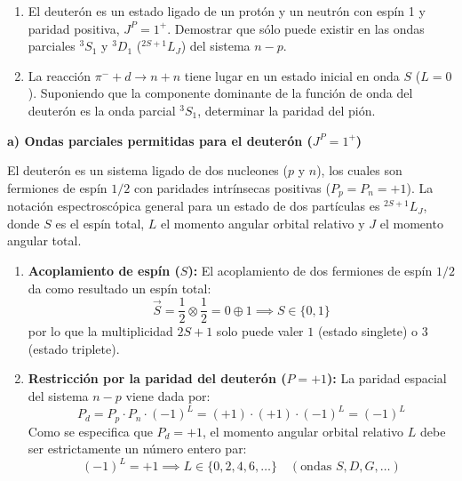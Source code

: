 \newpage
\begin{problema}
\begin{enumerate}[label=\alph*)]
    \item El deuterón es un estado ligado de un protón y un neutrón con espín 1 y paridad positiva, $J^P = 1^+$. Demostrar que sólo puede existir en las ondas parciales $^3S_1$ y $^3D_1$ ($^{2S+1}L_J$) del sistema $n-p$.
    \item La reacción $\pi^- + d \to n + n$ tiene lugar en un estado inicial en onda $S$ ($L = 0$). Suponiendo que la componente dominante de la función de onda del deuterón es la onda parcial $^3S_1$, determinar la paridad del pión.
\end{enumerate}
\tcblower
\textbf{a) Ondas parciales permitidas para el deuterón ($J^P = 1^+$)}

El deuterón es un sistema ligado de dos nucleones ($p$ y $n$), los cuales son fermiones de espín $1/2$ con paridades intrínsecas positivas ($P_p = P_n = +1$). La notación espectroscópica general para un estado de dos partículas es $^{2S+1}L_J$, donde $S$ es el espín total, $L$ el momento angular orbital relativo y $J$ el momento angular total.

\begin{enumerate}[label=\arabic*.]
    \item \textbf{Acoplamiento de espín ($S$):}
    El acoplamiento de dos fermiones de espín $1/2$ da como resultado un espín total:
    \begin{equation*}
        \vec{S} = \frac{1}{2} \otimes \frac{1}{2} = 0 \oplus 1 \implies S \in \{0, 1\}
    \end{equation*}
    por lo que la multiplicidad $2S+1$ solo puede valer $1$ (estado singlete) o $3$ (estado triplete).

    \item \textbf{Restricción por la paridad del deuterón ($P = +1$):}
    La paridad espacial del sistema $n-p$ viene dada por:
    \begin{equation*}
        P_d = P_p \cdot P_n \cdot (-1)^L = (+1) \cdot (+1) \cdot (-1)^L = (-1)^L
    \end{equation*}
    Como se especifica que $P_d = +1$, el momento angular orbital relativo $L$ debe ser estrictamente un número entero par:
    \begin{equation*}
        (-1)^L = +1 \implies L \in \{0, 2, 4, 6, \dots\} \quad (\text{ondas } S, D, G, \dots)
    \end{equation*}


\end{enumerate}
\end{problema}
